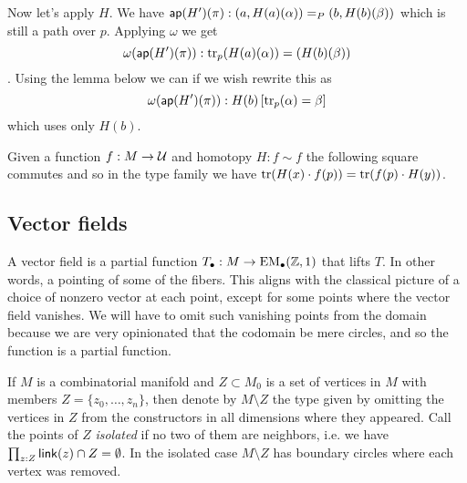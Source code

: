 Now let's apply \( H \). We have \( \mathsf{ap}(H')(\pi):(a,H(a)(\alpha))=_P(b,H(b)(\beta)) \) which is still a path over \( p \). Applying \( \omega \) we get \[ \omega(\mathsf{ap}(H')(\pi)):\mathrm{tr}_p(H(a)(\alpha))=(H(b)(\beta)) \]. Using the lemma below we can if we wish rewrite this as 
\[ 
\omega(\mathsf{ap}(H')(\pi)):H(b)\left[\mathrm{tr}_p(\alpha)=\beta\right]
\]
which uses only \( H(b) \).

\begin{mylemma}
Given a function \( f:M\to\mathcal{U} \) and homotopy \( H:f\sim f \) the following square commutes and so in the type family we have \( \mathrm{tr}(H(x)\cdot f(p)) = \mathrm{tr}(f(p)\cdot H(y)) \).
\end{mylemma}
\begin{center}
\end{center}

\subsection{Vector fields}

A vector field is a partial function \( T_\bullet:M\to\mathrm{EM_{\bullet}}(\mathbb{Z},1) \) that lifts \( T \). In other words, a pointing of some of the fibers. This aligns with the classical picture of a choice of nonzero vector at each point, except for some points where the vector field vanishes. We will have to omit such vanishing points from the domain because we are very opinionated that the codomain be mere circles, and so the function is a partial function.

\begin{mydef}
If \( M \) is a combinatorial manifold and \( Z\subset M_0 \) is a set of vertices in \( M \) with members \( Z=\{z_0,\ldots,z_n\} \), then denote by \( M\setminus Z \) the type given by omitting the vertices in \( Z \) from the constructors in all dimensions where they appeared. Call the points of \( Z \) \emph{isolated} if no two of them are neighbors, i.e. we have \( \prod_{z:Z}\mathsf{link}(z)\cap Z=\emptyset \). In the isolated case \( M\setminus Z \) has boundary circles where each vertex was removed.
\end{mydef}

